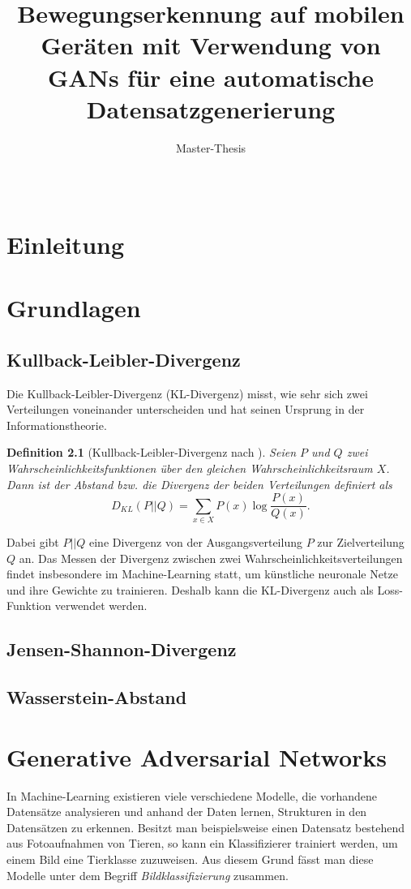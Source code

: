\documentclass{hsflensburg}
\title{Bewegungserkennung auf mobilen Geräten mit Verwendung von GANs für eine automatische Datensatzgenerierung}
\subtitle{Master-Thesis}
\author{
  \name{Florian Hansen}\\
  \institution{Hochschule Flensburg}
}
\newtheorem{definition}{Definition}
\begin{document}
  \maketitle
  \tableofcontents

  \chapter{Einleitung}

  \chapter{Grundlagen}
  \section{Kullback-Leibler-Divergenz}
  Die Kullback-Leibler-Divergenz (KL-Divergenz) misst, wie sehr sich zwei
  Verteilungen voneinander unterscheiden und hat seinen Ursprung in der
  Informationstheorie. 
  \begin{definition}[Kullback-Leibler-Divergenz nach \cite{10.1214/aoms/1177729694}]
    Seien $P$ und $Q$ zwei Wahrscheinlichkeitsfunktionen über den gleichen
    Wahrscheinlichkeitsraum $X$. Dann ist der Abstand bzw. die Divergenz der
    beiden Verteilungen definiert als
    \[
      D_{KL}(P \lvert\lvert Q) = \sum_{x \in X} P(x) \log \frac{P(x)}{Q(x)}.
    \]
  \end{definition}
  Dabei gibt $P \lvert\lvert Q$ eine Divergenz von der Ausgangsverteilung $P$
  zur Zielverteilung $Q$ an. Das Messen der Divergenz zwischen zwei
  Wahrscheinlichkeitsverteilungen findet insbesondere im Machine-Learning statt,
  um künstliche neuronale Netze und ihre Gewichte zu trainieren. Deshalb kann
  die KL-Divergenz auch als Loss-Funktion verwendet werden. 

  \section{Jensen-Shannon-Divergenz}
  \section{Wasserstein-Abstand}

  \chapter{Generative Adversarial Networks}
  In Machine-Learning existieren viele verschiedene Modelle, die vorhandene
  Datensätze analysieren und anhand der Daten lernen, Strukturen in den
  Datensätzen zu erkennen.  Besitzt man beispielsweise einen Datensatz
  bestehend aus Fotoaufnahmen von Tieren, so kann ein Klassifizierer trainiert
  werden, um einem Bild eine Tierklasse zuzuweisen. Aus diesem Grund fässt man
  diese Modelle unter dem Begriff \textit{Bildklassifizierung} zusammen.
\end{document}
